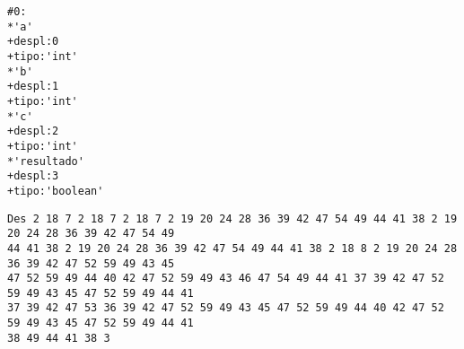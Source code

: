 \begin{enumerate}
    \begin{tcolorbox}[title={Volcado del fichero de la tabla de símbolos}, colback=white]
        \begin{lstlisting}
#0:
*'a'
+despl:0
+tipo:'int'
*'b'
+despl:1
+tipo:'int'
*'c'
+despl:2
+tipo:'int'
*'resultado'
+despl:3
+tipo:'boolean'
        \end{lstlisting}
    \end{tcolorbox}

    \begin{tcolorbox}[title={Volcado del parse}, colback=white]
        \begin{lstlisting}
Des 2 18 7 2 18 7 2 18 7 2 19 20 24 28 36 39 42 47 54 49 44 41 38 2 19 20 24 28 36 39 42 47 54 49
44 41 38 2 19 20 24 28 36 39 42 47 54 49 44 41 38 2 18 8 2 19 20 24 28 36 39 42 47 52 59 49 43 45
47 52 59 49 44 40 42 47 52 59 49 43 46 47 54 49 44 41 37 39 42 47 52 59 49 43 45 47 52 59 49 44 41
37 39 42 47 53 36 39 42 47 52 59 49 43 45 47 52 59 49 44 40 42 47 52 59 49 43 45 47 52 59 49 44 41
38 49 44 41 38 3
        \end{lstlisting}
    \end{tcolorbox}


\end{enumerate}
